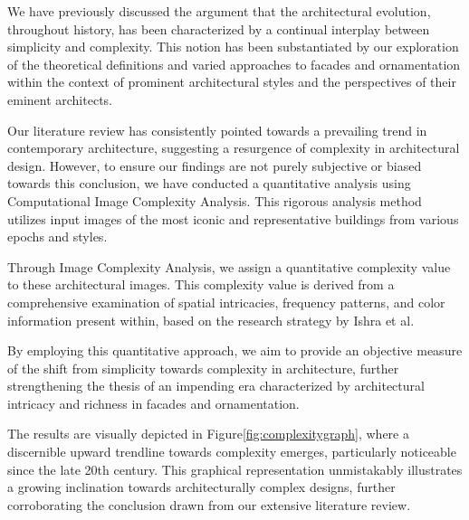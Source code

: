%    

We have previously discussed the argument that the architectural evolution, throughout history, has been characterized by a continual interplay between simplicity and complexity.
This notion has been substantiated by our exploration of the theoretical definitions and varied approaches to facades and ornamentation within the context of prominent architectural styles and the perspectives of their eminent architects.

Our literature review has consistently pointed towards a prevailing trend in contemporary architecture, suggesting a resurgence of complexity in architectural design.
However, to ensure our findings are not purely subjective or biased towards this conclusion, we have conducted a quantitative analysis using Computational Image Complexity Analysis.
This rigorous analysis method utilizes input images of the most iconic and representative buildings from various epochs and styles.

Through Image Complexity Analysis, we assign a quantitative complexity value to these architectural images.
This complexity value is derived from a comprehensive examination of spatial intricacies, frequency patterns, and color information present within, based on the research strategy by Ishra et al\cite{Ishrat2020}.

By employing this quantitative approach, we aim to provide an objective measure of the shift from simplicity towards complexity in architecture, further strengthening the thesis of an impending era characterized by architectural intricacy and richness in facades and ornamentation.

The results are visually depicted in Figure\ref{fig:complexitygraph}, where a discernible upward trendline towards complexity emerges, particularly noticeable since the late 20th century.
This graphical representation unmistakably illustrates a growing inclination towards architecturally complex designs, further corroborating the conclusion drawn from our extensive literature review.

